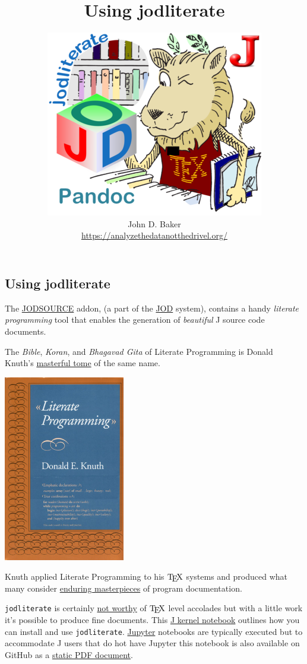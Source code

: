 \documentclass[11pt]{article}
\title{Using jodliterate}
\author{\includegraphics{inclusions/jodliteratelionlittle.png} \\John D. Baker \\ \url{https://analyzethedatanotthedrivel.org/}}
\let\Oldtex\TeX
\renewcommand{\TeX}{\textrm{\Oldtex}}
\begin{document}
    
    \maketitle
    
    

    

\hypertarget{using-jodliterate}{%
\subsection{Using jodliterate}\label{using-jodliterate}}

The
\href{https://code.jsoftware.com/wiki/Addons/general/jodsource}{JODSOURCE}
addon, (a part of the
\href{https://code.jsoftware.com/wiki/Addons/general/jod}{JOD} system),
contains a handy \emph{literate programming} tool that enables the
generation of \emph{beautiful} J source code documents.

The \emph{Bible}, \emph{Koran}, and \emph{Bhagavad Gita} of Literate
Programming is Donald Knuth's
\href{https://www.goodreads.com/book/show/112245.Literate_Programming}{masterful
tome} of the same name.

\includegraphics{inclusions/literate_programming_book_cover_smaller.png}

Knuth applied Literate Programming to his \(\TeX\) systems and produced
what many consider
\href{https://www.amazon.com/TeXbook-Donald-Knuth/dp/0201134489\#customerReviews}{enduring
masterpieces} of program documentation.

\texttt{jodliterate} is certainly
\href{https://www.youtube.com/watch?v=o5FT3IGXtAk}{not worthy} of
\(\TeX\) level accolades but with a little work it's possible to produce
fine documents. This \href{https://github.com/martin-saurer/jkernel}{J
kernel notebook} outlines how you can install and use
\texttt{jodliterate}. \href{https://jupyter.org/}{Jupyter} notebooks are
typically executed but to accommodate J users that do hot have Jupyter
this notebook is also available on GitHub as a
\href{https://github.com/bakerjd99/jacks/blob/master/jodliterate/UsingJodliterate.pdf}{static
PDF document}.
\end{document}

